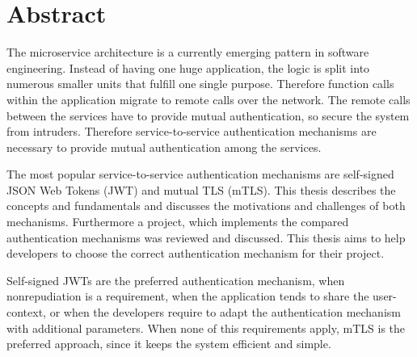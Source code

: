 \chapter{Abstract}
The microservice architecture is a currently emerging pattern in software engineering.
Instead of having one huge application, the logic is split into numerous smaller units that fulfill one single purpose.
Therefore function calls within the application migrate to remote calls over the network.
The remote calls between the services have to provide mutual authentication, so secure the system from intruders.
Therefore service-to-service authentication mechanisms are necessary to provide mutual authentication among the services.

The most popular service-to-service authentication mechanisms are self-signed JSON Web Tokens (JWT) and mutual TLS (mTLS).
This thesis describes the concepts and fundamentals and discusses the motivations and challenges of both mechanisms.
Furthermore a project, which implements the compared authentication mechanisms was reviewed and discussed.
This thesis aims to help developers to choose the correct authentication mechanism for their project.

Self-signed JWTs are the preferred authentication mechanism, when nonrepudiation is a requirement, when the application tends to share the user-context, or when the developers require to adapt the authentication mechanism with additional parameters.
When none of this requirements apply, mTLS is the preferred approach, since it keeps the system efficient and simple.

